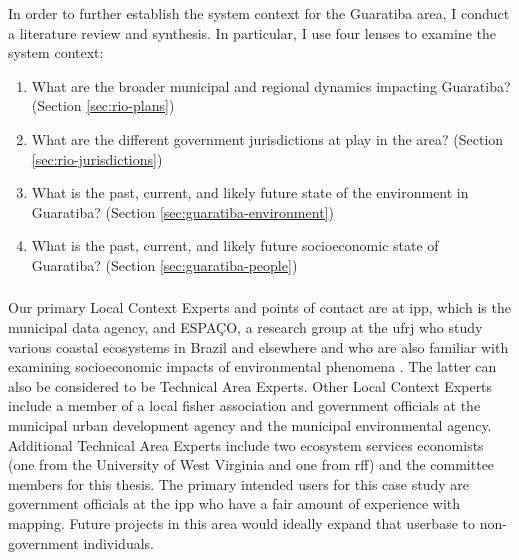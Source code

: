 In order to further establish the system context for the Guaratiba area, I conduct a literature review and synthesis. In particular, I use four lenses to examine the system context:

\begin{enumerate} \setlength{\itemsep}{0pt} \setlength{\parskip}{0pt}
    \item What are the broader municipal and regional dynamics impacting Guaratiba? (Section \ref{sec:rio-plans})
    \item What are the different government jurisdictions at play in the area? (Section \ref{sec:rio-jurisdictions})
    \item What is the past, current, and likely future state of the environment in Guaratiba? (Section \ref{sec:guaratiba-environment})
    \item What is the past, current, and likely future socioeconomic state of Guaratiba? (Section \ref{sec:guaratiba-people})
\end{enumerate}

\subsubsection{}

Our primary Local Context Experts and points of contact are at \ac{ipp}, which is the municipal data agency, and ESPAÇO, a research group at the \ac{ufrj} who study various coastal ecosystems in Brazil and elsewhere \cite{cruzClassificacaoOrientadaObjetos2007, seabraMapeamentoDinamicaCobertura2013} and who are also familiar with examining socioeconomic impacts of environmental phenomena \cite{schwenkResearchEnvironmentalSocioeconomical2008}. The latter can also be considered to be Technical Area Experts. Other Local Context Experts include a member of a local fisher association and government officials at the municipal urban development agency and the municipal environmental agency. Additional Technical Area Experts include two ecosystem services economists (one from the University of West Virginia and one from \ac{rff}) and the committee members for this thesis. The primary intended users for this case study are government officials at the \ac{ipp} who have a fair amount of experience with mapping. Future projects in this area would ideally expand that userbase to non-government individuals. 

